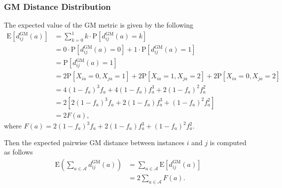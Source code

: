 \documentclass[10pt,letterpaper]{article}\usepackage[]{graphicx}\usepackage[]{color}
\begin{document}
\subsubsection{GM Distance Distribution}

The expected value of the GM metric is given by the following
%
\begin{equation}\label{eq:mean_diff_GM}
\begin{aligned}
\text{E}\left[d^\text{GM}_{ij}(a)\right] &= \sum_{k=0}^{1} k \cdot \text{P}\left[d^\text{GM}_{ij}(a) = k\right] \\
&= 0 \cdot \text{P}\left[d^\text{GM}_{ij}(a) = 0\right] + 1 \cdot \text{P}\left[d^\text{GM}_{ij}(a) = 1\right] \\
&= \text{P}\left[d^\text{GM}_{ij}(a) = 1\right] \\
&= 2\text{P}[X_{ia} = 0, X_{ja} = 1] + 2\text{P}[X_{ia} = 1, X_{ja} = 2] + 2\text{P}[X_{ia} = 0, X_{ja} = 2] \\
&= 4(1 - f_a)^3f_a + 4(1 - f_a)f^3_a + 2(1 - f_a)^2f^2_a \\
&= 2\left[2(1 - f_a)^3f_a + 2(1 - f_a)f^3_a + (1 - f_a)^2f^2_a\right] \\
&= 2F(a),
\end{aligned}
\end{equation}
where $F(a) = 2(1 - f_a)^3f_a + 2(1 - f_a)f^3_a + (1 - f_a)^2f^2_a$.

Then the expected pairwise GM distance between instances $i$ and $j$ is computed as follows
%
\begin{equation}\label{eq:mu_DDistr_GM}
\begin{aligned}
\text{E}\left(\sum_{a \in \mathcal{A}} d^\text{GM}_{ij}(a)\right) &= \sum_{a \in \mathcal{A}} \text{E}\left[d^\text{GM}_{ij}(a)\right] \\
&= 2 \sum_{a \in \mathcal{A}} F(a).
\end{aligned}
\end{equation}
\end{document}

